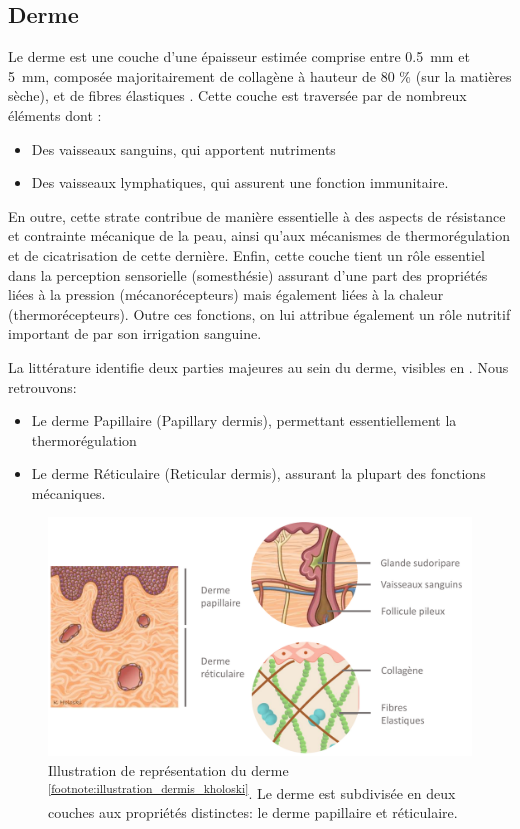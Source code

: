 \subsection{Derme}
Le derme est une couche d’une épaisseur estimée comprise entre \SI{0,5}{\milli\metre} et \SI{5}{\milli\metre}, composée majoritairement de collagène à hauteur de 80 \% (sur la matières sèche), et de fibres élastiques \cite{McGrath2010}. Cette couche est traversée par de nombreux éléments dont : 

\begin{itemize}
\item Des vaisseaux sanguins, qui apportent nutriments
\item Des vaisseaux lymphatiques, qui assurent une fonction immunitaire.
\end{itemize}\par

En outre, cette strate contribue de manière essentielle à des aspects de résistance et contrainte mécanique de la peau, ainsi qu’aux mécanismes de thermorégulation et de cicatrisation de cette dernière. Enfin, cette couche tient un rôle essentiel dans la perception sensorielle (somesthésie) assurant d’une part des propriétés liées à la pression (mécanorécepteurs) mais également liées à la chaleur (thermorécepteurs). Outre ces fonctions, on lui attribue également un rôle nutritif important de par son irrigation sanguine.\par
La littérature identifie deux parties majeures au sein du derme, visibles en . Nous retrouvons:
\begin{itemize}
\item Le derme Papillaire (Papillary dermis), permettant essentiellement la thermorégulation
\item Le derme Réticulaire (Reticular dermis), assurant la plupart des fonctions mécaniques.
\end{itemize}\par

\begin{figure}[H]
    \centering
    \includegraphics[width=\linewidth]{contents/chapter_1/resources/illustration_dermis_kholoski.pdf}
    \caption{Illustration de représentation du derme \textsuperscript{\ref{footnote:illustration_dermis_kholoski}}. Le derme est subdivisée en deux couches aux propriétés distinctes: le derme papillaire et réticulaire.}
    \label{fig:illustration_dermis_kholoski}
\end{figure}\par

